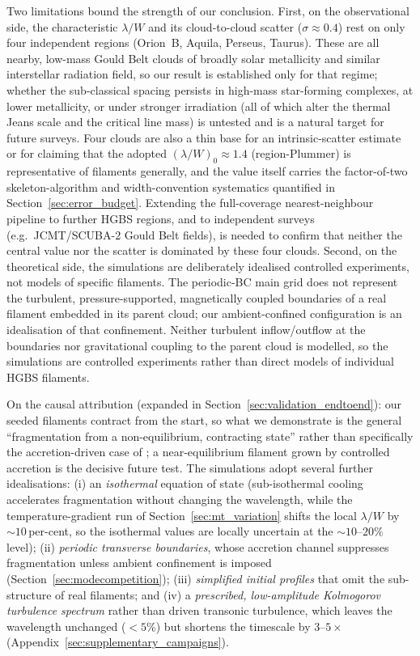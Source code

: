 \documentclass[usenatbib,twoside,twocolumn]{mnras}
\begin{document}
Two limitations bound the strength of our conclusion. First, on the observational side, the characteristic $\lambda/W$ and its cloud-to-cloud scatter ($\sigma\approx0.4$) rest on only four independent regions (Orion~B, Aquila, Perseus, Taurus). These are all nearby, low-mass Gould Belt clouds of broadly solar metallicity and similar interstellar radiation field, so our result is established only for that regime; whether the sub-classical spacing persists in high-mass star-forming complexes, at lower metallicity, or under stronger irradiation (all of which alter the thermal Jeans scale and the critical line mass) is untested and is a natural target for future surveys. Four clouds are also a thin base for an intrinsic-scatter estimate or for claiming that the adopted $(\lambda/W)_0\approx1.4$ (region-Plummer) is representative of filaments generally, and the value itself carries the factor-of-two skeleton-algorithm and width-convention systematics quantified in Section~\ref{sec:error_budget}. Extending the full-coverage nearest-neighbour pipeline to further HGBS regions, and to independent surveys (e.g.\ JCMT/SCUBA-2 Gould Belt fields), is needed to confirm that neither the central value nor the scatter is dominated by these four clouds. Second, on the theoretical side, the simulations are deliberately idealised controlled experiments, not models of specific filaments. The periodic-BC main grid does not represent the turbulent, pressure-supported, magnetically coupled boundaries of a real filament embedded in its parent cloud; our ambient-confined configuration is an idealisation of that confinement. Neither turbulent inflow/outflow at the boundaries nor gravitational coupling to the parent cloud is modelled, so the simulations are controlled experiments rather than direct models of individual HGBS filaments.

On the causal attribution (expanded in Section~\ref{sec:validation_endtoend}): our seeded filaments contract from the start, so what we demonstrate is the general ``fragmentation from a non-equilibrium, contracting state'' rather than specifically the accretion-driven case of \citet{Clarke2016,Clarke2017}; a near-equilibrium filament grown by controlled accretion is the decisive future test. The simulations adopt several further idealisations: (i) an \emph{isothermal} equation of state (sub-isothermal cooling accelerates fragmentation without changing the wavelength, while the temperature-gradient run of Section~\ref{sec:mt_variation} shifts the local $\lambda/W$ by $\sim10$\,per-cent, so the isothermal values are locally uncertain at the $\sim10$--$20\%$ level); (ii) \emph{periodic transverse boundaries}, whose accretion channel suppresses fragmentation unless ambient confinement is imposed (Section~\ref{sec:modecompetition}); (iii) \emph{simplified initial profiles} that omit the sub-structure of real filaments; and (iv) a \emph{prescribed, low-amplitude Kolmogorov turbulence spectrum} rather than driven transonic turbulence, which leaves the wavelength unchanged ($<5\%$) but shortens the timescale by $3$--$5\times$ (Appendix~\ref{sec:supplementary_campaigns}).
\end{document}
